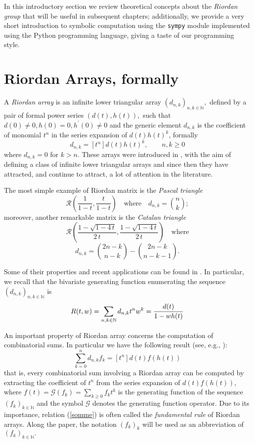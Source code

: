 
In this introductory section we review theoretical concepts about the
\textit{Riordan group} that will be useful in subsequent chapters;
additionally, we provide a very short introduction to symbolic computation
using the \verb|sympy| module implemented using the Python programming
language, giving a taste of our programming style.


\section{Riordan Arrays, formally}

A \textit{Riordan array} is an infinite lower triangular array
$(d_{n,k} )_{n,k \in \mathbb{N}},$ defined by a pair of formal power series
$(d(t),h(t)),$ such that $d(0)\neq 0, h(0)=0, h^\prime(0)\neq0$ and the generic
element $d_{n,k}$ is the coefficient of monomial $t^{n}$ in the series
expansion of $d(t)h(t)^{k}$, formally
\begin{displaymath}
    d_{n,k}=[t^n]d(t)h(t)^k, \qquad n,k \geq 0
\end{displaymath}
where $d_{n,k}=0$ for $k>n.$ These arrays were introduced in
\citep{SHAPIRO1991229}, with the aim of defining a class of infinite lower
triangular arrays and since then they have attracted, and continue to attract,
a lot of attention in the literature.

The most simple example of Riordan matrix is the \textit{Pascal triangle}
$$\mathcal{R}\left(\frac{1}{1-t}, \frac{t}{1-t}\right)\quad\text{where}\quad
d_{n,k}={n\choose k};$$ moreover, another remarkable matrix is the
\textit{Catalan triangle}
$$\mathcal{R}\left(\frac{1-\sqrt{1-4\,t}}{2\,t}, \frac{1-\sqrt{1-4\,t}}{2\,t}\right)
\quad\text{where}$$
$$d_{n,k}={{2n-k}\choose{n-k}} - {{2n-k}\choose{n-k-1}}.$$

Some of their properties  and recent applications can be found
in \citep{LUZON201475,MRSV97}. In particular, we recall that the bivariate generating
function enumerating the sequence $(d_{n,k} )_{n,k \in\mathbb{N}}$ is
\begin{equation}
    \label{bgf}
    R(t,w) = \sum_{n,k \in\mathbb{N}}{d_{n,k} t^n w^k} = {d(t) \over 1-wh(t)}
\end{equation}

An important property of Riordan array concerns the computation of
combinatorial sums.  In particular we have the following result (see, e.g.,
\citep{LUZON2012631,Merlini:2009:CSI:2653507.2654195,SPRUGNOLI1994267}):
\begin{equation}
    \label{somme}
    \sum_{k=0}^n d_{n,k}f_k=[t^n]d(t)f(h(t))
\end{equation}
that is, every combinatorial sum involving a Riordan array can be computed by
extracting the coefficient of $t^n$ from the series expansion of $d(t)f(h(t))$,
where $f(t)=\mathcal{G}(f_k)=\sum_{k\geq 0}f_kt^k$ is the generating function of the
sequence $(f_k)_{k \in\mathbb{N}}$ and the symbol $\mathcal{G}$ denotes the generating function
operator. Due to its importance, relation (\ref{somme}) is often called the
\textit{fundamental rule} of Riordan arrays.  Along the paper, the notation
$(f_k)_{k}$ will be used as an abbreviation of $(f_k)_{k\in\mathbb{N}}.$

